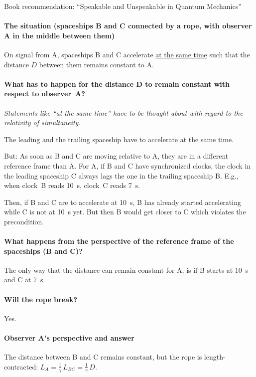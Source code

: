 \documentclass[pagesize,headsepline,10pt,parskip=half]{scrreprt}
\begin{document}
        Book recommendation: ``Speakable and Unspeakable in Quantum Mechanics''
        \paragraph{The situation (spaceships B and C connected by a rope,
          with observer A in the middle between them)}
          On signal from A, spaceships B and C accelerate
          \underline{at the same time} such that the distance $D$ between them
          remains constant to A.

        \paragraph{What has to happen for the distance D to remain constant
          with respect to observer~A?}
          \emph{Statements like ``at the same time'' have to be thought
            about with regard to the relativity of simultaneity.}

          The leading and the trailing spaceship have to accelerate at the
          same time.

          But: As soon as B and C are moving relative to A, they are in a different
          reference frame than A.  For A, if B and C have synchronized clocks,
          the clock in the leading spaceship C always lags the one in the trailing
          spaceship B.  E.g., when clock~B reads \SI{10}{\second}, clock~C reads
          \SI{7}{\second}.

          Then, if B and C are to accelerate at \SI{10}{\second}, B has already
          started accelerating while C is not at \SI{10}{\second} yet.  But then
          B would get closer to C which violates the precondition.

        \paragraph{What happens from the perspective of the reference frame
          of the spaceships (B and C)?}
          The only way that the distance can remain constant for A, is if
          B starts at \SI{10}{\second} and C at \SI{7}{\second}.

        \paragraph{Will the rope break?}
          Yes.

        \paragraph{Observer A’s perspective and answer}
          The distance between B and C remains constant, but the rope is
          length-contracted:
          $L_A = \frac{1}{\gamma} \, L_{BC} = \frac{1}{\gamma} \, D$.
\end{document}
